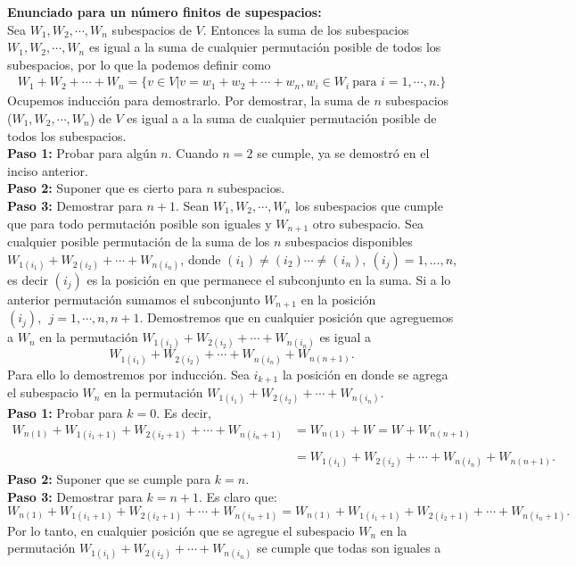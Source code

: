 \documentclass[11pt,letterpaper]{article}
\begin{document}
\begin{enumerate}
\textbf{Enunciado para un número finitos de supespacios:}\\
Sea $W_1,W_2, \cdots , W_n$ subespacios de $V$. Entonces la suma de los subespacios $W_1,W_2,\cdots,W_n$ es igual a la suma de cualquier permutación posible de todos los subespacios, por lo que la podemos definir como
\begin{align*}
W_1+W_2+\cdots+W_n=\{v\in V| v=w_1+w_2+\cdots+w_n, w_i\in W_i \ \text{para } i=1,\cdots,n. \}
\end{align*}
Ocupemos inducción para demostrarlo. Por demostrar, la suma de $n$ subespacios ($W_1,W_2, \cdots , W_n$) de $V$ es igual a a la suma de cualquier permutación posible de todos los subespacios.\\
\textbf{Paso 1:} Probar para algún $n$. Cuando $n=2$ se cumple, ya se demostró en el inciso anterior.\\
\textbf{Paso 2:} Suponer que es cierto para $n$ subespacios.\\
\textbf{Paso 3:} Demostrar para $n+1$. Sean $W_1,W_2, \cdots , W_n$ los subespacios que cumple que para todo permutación posible son iguales y $W_{n+1}$ otro subespacio. Sea cualquier posible permutación de la suma de los $n$ subespacios disponibles $W_{1(i_1)}+W_{2(i_2)}+\cdots+W_{n(i_n)}$, donde $(i_1)\neq (i_2)\cdots \neq (i_n), \ (i_j)=1,...,n$, es decir $(i_j)$ es la posición en que permanece el subconjunto en la suma. Si a lo anterior permutación sumamos el subconjunto $W_{n+1}$ en la posición $(i_j), \ \ j=1,\cdots,n,n+1.$ Demostremos que en cualquier posición que agreguemos a $W_n$ en la permutación $W_{1(i_1)}+W_{2(i_2)}+\cdots+W_{n(i_n)}$ es igual a $$W_{1(i_1)}+W_{2(i_2)}+\cdots+W_{n(i_n)}+W_{n(n+1)}.$$
Para ello lo demostremos por inducción. Sea $i_{k+1}$ la posición en donde se agrega el subespacio $W_{n}$ en la permutación $W_{1(i_1)}+W_{2(i_2)}+\cdots+W_{n(i_n)}$. \\
\textbf{Paso 1:} Probar para $k=0$. Es decir,
\begin{align*}
W_{n(1)}+W_{1(i_1+1)}+W_{2(i_2+1)}+\cdots+W_{n(i_n+1)} &=W_{n(1)}+W=W+W_{n(n+1)}\\ \\ 
&=W_{1(i_1)}+W_{2(i_2)}+\cdots+W_{n(i_n)}+W_{n(n+1)}.
\end{align*} 
\textbf{Paso 2:} Suponer que se cumple para $k=n$.\\
\textbf{Paso 3:} Demostrar para $k=n+1$. Es claro que: 
$$W_{n(1)}+W_{1(i_1+1)}+W_{2(i_2+1)}+\cdots+W_{n(i_n+1)}=W_{n(1)}+W_{1(i_1+1)}+W_{2(i_2+1)}+\cdots+W_{n(i_n+1)}.$$
Por lo tanto, en cualquier posición que se agregue el subespacio $W_n$ en la permutación $W_{1(i_1)}+W_{2(i_2)}+\cdots+W_{n(i_n)}$ se cumple que todas son iguales a 

\end{enumerate}
\end{document}
